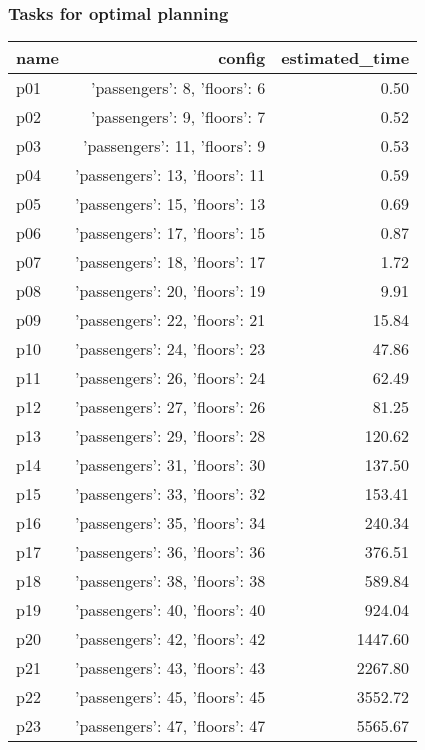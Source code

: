 \documentclass{article}
\begin{document}
                                \subsubsection*{Tasks for optimal planning}
                                
                            \begin{center}
                            \scriptsize
                            \begin{tabular}{@{}l|r|r@{}}
                            name & config & estimated\_time\\\midrule
                              p01&{'passengers': 8, 'floors': 6}&0.50\\
  p02&{'passengers': 9, 'floors': 7}&0.52\\
  p03&{'passengers': 11, 'floors': 9}&0.53\\
  p04&{'passengers': 13, 'floors': 11}&0.59\\
  p05&{'passengers': 15, 'floors': 13}&0.69\\
  p06&{'passengers': 17, 'floors': 15}&0.87\\
  p07&{'passengers': 18, 'floors': 17}&1.72\\
  p08&{'passengers': 20, 'floors': 19}&9.91\\
  p09&{'passengers': 22, 'floors': 21}&15.84\\
  p10&{'passengers': 24, 'floors': 23}&47.86\\
  p11&{'passengers': 26, 'floors': 24}&62.49\\
  p12&{'passengers': 27, 'floors': 26}&81.25\\
  p13&{'passengers': 29, 'floors': 28}&120.62\\
  p14&{'passengers': 31, 'floors': 30}&137.50\\
  p15&{'passengers': 33, 'floors': 32}&153.41\\
  p16&{'passengers': 35, 'floors': 34}&240.34\\
  p17&{'passengers': 36, 'floors': 36}&376.51\\
  p18&{'passengers': 38, 'floors': 38}&589.84\\
  p19&{'passengers': 40, 'floors': 40}&924.04\\
  p20&{'passengers': 42, 'floors': 42}&1447.60\\
  p21&{'passengers': 43, 'floors': 43}&2267.80\\
  p22&{'passengers': 45, 'floors': 45}&3552.72\\
  p23&{'passengers': 47, 'floors': 47}&5565.67\\

\end{tabular}
\end{center}
\end{document}
